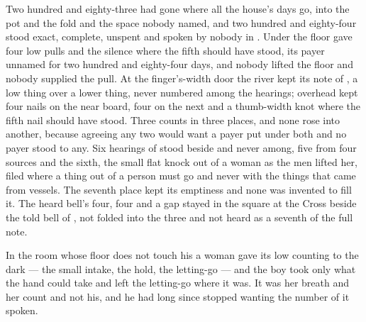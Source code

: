 Two hundred and eighty-three had gone where all the house's days go, into the pot and the fold and the space nobody named, and two hundred and eighty-four stood exact, complete, unspent and spoken by nobody in . Under the floor  gave four low pulls and the silence where the fifth should have stood, its payer unnamed for two hundred and eighty-four days, and nobody lifted the floor and nobody supplied the pull. At the finger's-width door the river kept its note of , a low thing over a lower thing, never numbered among the hearings; overhead  kept four nails on the near board, four on the next and a thumb-width knot where the fifth nail should have stood. Three counts in three places, and none rose into another, because agreeing any two would want a payer put under both and no payer stood to any. Six hearings of  stood beside and never among, five from four sources and the sixth, the small flat knock out of a woman as the men lifted her, filed where a thing out of a person must go and never with the things that came from vessels. The seventh place kept its emptiness and none was invented to fill it. The heard bell's four, four and a gap stayed in the square at the Cross beside the told bell of , not folded into the three and not heard as a seventh of the full note.

In the room whose floor does not touch his a woman gave its low counting to the dark --- the small intake, the hold, the letting-go --- and the boy took only what the hand could take and left the letting-go where it was. It was her breath and her count and not his, and he had long since stopped wanting the number of it spoken.


